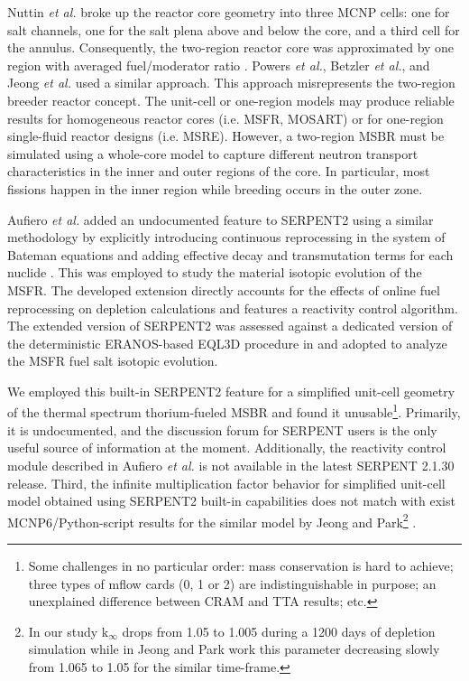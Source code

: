 Nuttin \emph{et al.} broke up the reactor core geometry into three \gls{MCNP} cells: 
one for salt channels, one for the salt plena above and below the core, and a 
third cell for the annulus. Consequently, the two-region reactor core was 
approximated by one region with averaged fuel/moderator ratio 
\cite{nuttin_potential_2005}.  Powers \emph{et 
al.}, Betzler \emph{et al.}, and Jeong \emph{et al.} 
\cite{powers_new_2013,powers_inventory_2014,betzler_modeling_2016, 
betzler_molten_2017, jeong_development_2014, jeong_equilibrium_2016} used a 
similar approach. This approach 
misrepresents the two-region breeder reactor concept. The unit-cell or one-region 
models may produce reliable results for homogeneous reactor cores (i.e. 
\gls{MSFR}, \gls{MOSART}) or for one-region single-fluid reactor designs (i.e. 
\gls{MSRE}). However, a two-region \gls{MSBR} must be simulated using a whole-core 
model to capture different neutron transport characteristics in the inner and 
outer regions of the core. In particular, most fissions happen in the inner 
region while breeding occurs in the outer zone.  

Aufiero \emph{et al.} added an undocumented 
feature to SERPENT2 
using a similar methodology by explicitly introducing 
continuous reprocessing in the system of Bateman equations and adding effective 
decay and transmutation terms for each nuclide 
\cite{aufiero_extended_2013}. This was employed to study the material isotopic evolution of the 
\gls{MSFR}\cite{aufiero_extended_2013}. The developed extension directly accounts for the effects of online fuel 
reprocessing on depletion calculations and features a reactivity control 
algorithm. The extended version of SERPENT2 was assessed against a dedicated 
version of the deterministic ERANOS-based EQL3D procedure in
\cite{ruggieri_eranos_2006, fiorina_investigation_2013} and adopted to analyze 
the \gls{MSFR} fuel salt isotopic evolution. 

We employed this built-in SERPENT2 feature for a simplified unit-cell geometry of 
the thermal spectrum thorium-fueled \gls{MSBR} and found it unusable\footnote{ 
Some challenges in no particular order: mass conservation is hard to achieve; 
three types of mflow cards (0, 1 or 2) are indistinguishable in purpose; an 
unexplained difference between CRAM and TTA results; etc.}. Primarily,
it is undocumented, and the discussion forum for SERPENT users is the only useful 
source of information at the moment. Additionally, the reactivity control module described in Aufiero \emph{et al.} is 
not available in the latest SERPENT 2.1.30 release. Third, the infinite multiplication 
factor behavior for simplified unit-cell model obtained using SERPENT2 built-in 
capabilities \cite{rykhlevskii_online_2017} does not match with exist MCNP6/Python-script
 results for the similar model by Jeong and Park\footnote{ In our 
study k$_{\infty}$ drops from 1.05 to 1.005 during a 1200 days of depletion simulation 
while in Jeong and Park work this parameter decreasing slowly from 1.065 to 1.05 for the 
similar time-frame.} \cite{jeong_equilibrium_2016}. 

